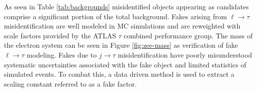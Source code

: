 		\begin{table}[!thp]
			\caption{Control region definitions for the \taulep subchannel.}
			\label{tab:taulep-control-regions}
		\end{table}

		As seen in Table \ref{tab:backgrounds} misidentified objects appearing as \tauhad candidates comprise a significant portion of the total background. Fakes arising from $\ell \to \tau$ misidentification are well modeled in \gls{MC} simulations and are reweighted with scale factors provided by the ATLAS $\tau$ combined performance group. The mass of the \tauhad electron system can be seen in Figure \ref{fig:zee-mass} as verification of fake $\ell \to \tau$ modeling. Fakes due to $j \to \tau$ misidentification have poorly misunderstood systematic uncertainties associated with the fake \tauhad object and limited statistics of simulated events. To combat this, a data driven method is used to extract a scaling constant referred to as a fake factor.

